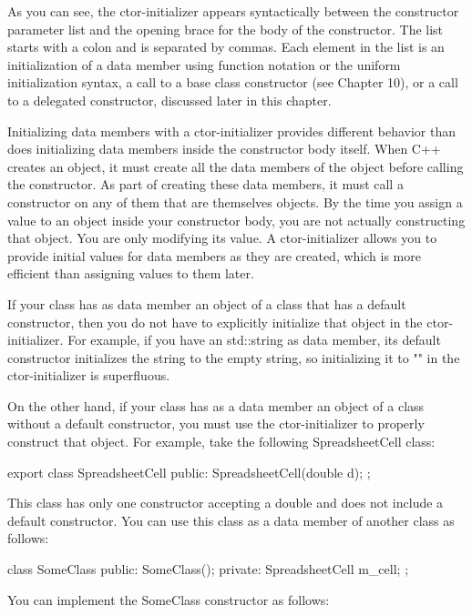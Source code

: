 As you can see, the ctor-initializer appears syntactically between the constructor parameter list and the opening brace for the body of the constructor. The list starts with a colon and is separated by commas. Each element in the list is an initialization of a data member using function notation or the uniform initialization syntax, a call to a base class constructor (see Chapter 10), or a call to a delegated constructor, discussed later in this chapter.

Initializing data members with a ctor-initializer provides different behavior than does initializing data members inside the constructor body itself. When C++ creates an object, it must create all the data members of the object before calling the constructor. As part of creating these data members, it must call a constructor on any of them that are themselves objects. By the time you assign a value to an object inside your constructor body, you are not actually constructing that object. You are only modifying its value. A ctor-initializer allows you to provide initial values for data members as they are created, which is more efficient than assigning values to them later.

If your class has as data member an object of a class that has a default constructor, then you do not have to explicitly initialize that object in the ctor-initializer. For example, if you have an std::string as data member, its default constructor initializes the string to the empty string, so initializing it to "" in the ctor-initializer is superfluous.

On the other hand, if your class has as a data member an object of a class without a default constructor, you must use the ctor-initializer to properly construct that object. For example, take the following SpreadsheetCell class:

\begin{cpp}
export class SpreadsheetCell
{
    public:
        SpreadsheetCell(double d);
};
\end{cpp}

This class has only one constructor accepting a double and does not include a default constructor. You can use this class as a data member of another class as follows:

\begin{cpp}
class SomeClass
{
    public:
        SomeClass();
    private:
        SpreadsheetCell m_cell;
};
\end{cpp}

You can implement the SomeClass constructor as follows:

